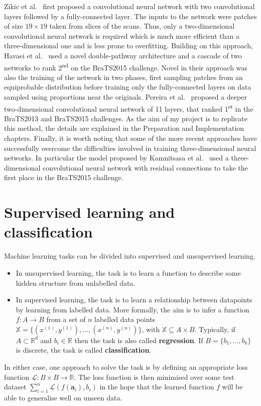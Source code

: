 \documentclass[12pt,a4paper,twoside,openright]{report}
\begin{document}
Zikic et al.\ \cite{zikic} first proposed a convolutional neural network with two convolutional layers followed by a fully-connected layer. The inputs to the network were patches of size $19 \times 19$ taken from slices of the scans. Thus, only a two-dimensional convolutional neural network is required which is much more efficient than a three-dimensional one and is less prone to overfitting. Building on this approach, Havaei et al.\ \cite{havaei} used a novel double-pathway architecture and a cascade of two networks to rank 2\textsuperscript{nd} on the BraTS2015 challenge. Novel in their approach was also the training of the network in two phases, first sampling patches from an equiprobable distribution before training only the fully-connected layers on data sampled using proportions near the originals. Pereira et al.\ \cite{pereira} proposed a deeper two-dimensional convolutional neural network of 11 layers, that ranked 1\textsuperscript{st} in the BraTS2013 and BraTS2015 challenges. As the aim of my project is to replicate this method, the details are explained in the Preparation and Implementation chapters. Finally, it is worth noting that some of the more recent approaches have successfully overcome the difficulties involved in training three-dimensional neural networks. In particular the model proposed by Kamnitsasa et al.\ \cite{kamnitsas} used a three-dimensional convolutional neural network with residual connections \cite{resnet} to take the first place in the BraTS2015 challenge.

\section{Supervised learning and classification}
Machine learning tasks can be divided into supervised and unsupervised learning.
\begin{itemize}
	\item In unsupervised learning, the task is to learn a function to describe some hidden structure from unlabelled data. 
	\item In supervised learning, the task is to learn a relationship between datapoints by learning from labelled data. More formally, the aim is to infer a function $f: A \to B$ from a set of $n$ labelled data points $\mathbb{X} = \{(x^{(1)}, y^{(1)}), ..., (x^{(n)}, y^{(n)})\}$, with $\mathbb{X} \subseteq A \times B$. Typically, if $A \subset \mathbb{R}^d$ and $b_i \in \mathbb{R}$ then the task is also called \textbf{regression}. If $B = \{b_1, ..., b_k\}$ is discrete, the task is called \textbf{classification}. 
\end{itemize} 
In either case, one approach to solve the task is by defining an appropriate loss function $\mathcal{L}: B \times B \to \mathbb{R}$. The loss function is then minimised over some test dataset $\sum_{i=1}^n \mathcal{L}(f(\textbf{a}_i), b_i)$ in the hope that the learned function $f$ will be able to generalise well on unseen data.
\end{document}
